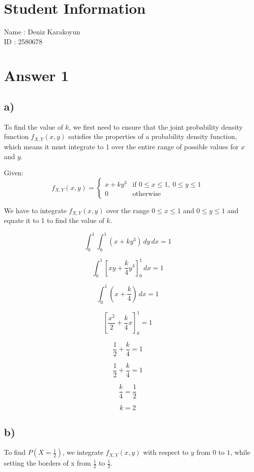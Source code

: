 \documentclass[12pt]{article}
\begin{document}
\section*{Student Information}

Name : Deniz Karakoyun\\

ID : 2580678\\


\section*{Answer 1}
\subsection*{a)} 
To find the value of \( k \), we first need to ensure that the joint probability density function \( f_{X,Y}(x, y) \) satisfies the properties of a probability density function, which means it must integrate to 1 over the entire range of possible values for \( x \) and \( y \).

Given:
\[ f_{X,Y}(x, y) =
\begin{cases}
x + ky^3 & \text{if } 0 \leq x \leq 1, \ 0 \leq y \leq 1 \\
0 & \text{otherwise}
\end{cases}
\]

We have to integrate \( f_{X,Y}(x, y) \) over the range \( 0 \leq x \leq 1 \) and \( 0 \leq y \leq 1 \) and equate it to 1 to find the value of \( k \).

\[ \int_{0}^{1} \int_{0}^{1} (x + ky^3) \, dy \, dx = 1 \]

\[ \int_{0}^{1} \left[ xy + \frac{k}{4}y^4 \right]_{0}^{1} \, dx = 1 \]

\[ \int_{0}^{1} \left( x + \frac{k}{4} \right) \, dx = 1 \]

\[ \left[ \frac{x^2}{2} + \frac{k}{4}x \right]_{0}^{1} = 1 \]

\[ \frac{1}{2} + \frac{k}{4} = 1 \]

\[ \frac{1}{2} + \frac{k}{4} = 1 \]

\[ \frac{k}{4} = \frac{1}{2} \]

\[ k = 2 \]

\subsection*{b)} 
To find \( P(X = \frac{1}{2}) \), we integrate \( f_{X,Y}(x, y) \) with respect to \( y \) from \( 0 \) to \( 1 \), while setting the borders of x  from \( \frac{1}{2} \) to \( \frac{1}{2} \).
\end{document}
